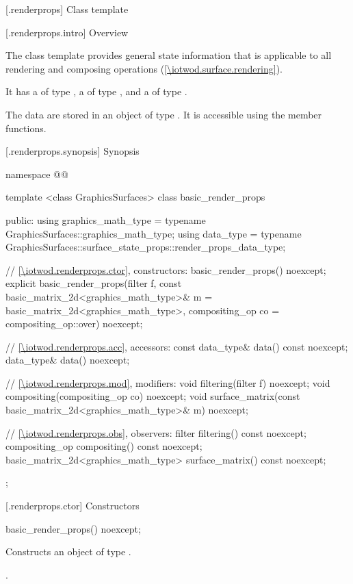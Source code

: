 
 [\iotwod.renderprops] {Class template }

 [\iotwod.renderprops.intro] {Overview}

\pnum
The  class template provides general state information that is applicable to all rendering and composing operations (\ref{\iotwod.surface.rendering}).

\pnum
It has a  of type , a  of type , and a  of type .

\pnum
The data are stored in an object of type . It is accessible using the  member functions.

 [\iotwod.renderprops.synopsis] {Synopsis}

\begin{codeblock}
namespace @\fullnamespace{}@ {
  template <class GraphicsSurfaces>
  class basic_render_props {
  public:
    using graphics_math_type = typename GraphicsSurfaces::graphics_math_type;
    using data_type =
      typename GraphicsSurfaces::surface_state_props::render_props_data_type;

    // \ref{\iotwod.renderprops.ctor}, constructors:
    basic_render_props() noexcept;
    explicit basic_render_props(filter f,
      const basic_matrix_2d<graphics_math_type>& m = basic_matrix_2d<graphics_math_type>{},
      compositing_op co = compositing_op::over) noexcept;
    
    // \ref{\iotwod.renderprops.acc}, accessors:
    const data_type& data() const noexcept;
    data_type& data() noexcept;

    // \ref{\iotwod.renderprops.mod}, modifiers:
    void filtering(filter f) noexcept;
    void compositing(compositing_op co) noexcept;
    void surface_matrix(const basic_matrix_2d<graphics_math_type>& m) noexcept;

    // \ref{\iotwod.renderprops.obs}, observers:
    filter filtering() const noexcept;
    compositing_op compositing() const noexcept;
    basic_matrix_2d<graphics_math_type> surface_matrix() const noexcept;
  };
}
\end{codeblock}

 [\iotwod.renderprops.ctor] {Constructors}

\begin{itemdecl}
basic_render_props() noexcept;
\end{itemdecl}
\begin{itemdescr}
\pnum
\effects
Constructs an object of type .

\pnum
\postconditions
{}.
\end{itemdescr}

